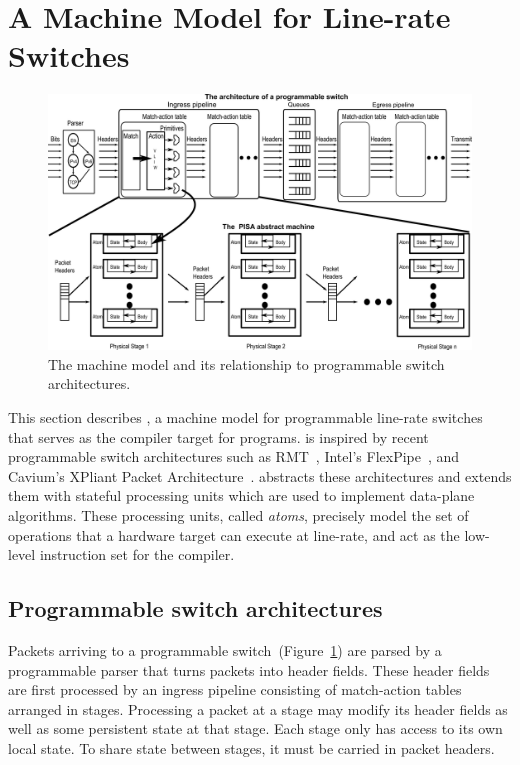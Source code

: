 \section{A Machine Model for Line-rate Switches}
\label{s:absmachine}

\begin{figure}[!t]
  \includegraphics[width=\textwidth]{pisa.pdf}
  \caption{The \absmachine machine model and its relationship to
  programmable switch architectures.}
  \label{fig:switch}
\end{figure}

This section describes \absmachine, a machine model for programmable line-rate
switches that serves as the compiler target for \pktlanguage programs.
\absmachine is inspired by recent programmable switch architectures such as
RMT~\cite{rmt}, Intel's FlexPipe~\cite{flexpipe}, and Cavium's XPliant Packet
Architecture~\cite{xpliant}. \absmachine abstracts these architectures and
extends them with stateful processing units which are used to implement
data-plane algorithms. These processing units, called {\em atoms}, precisely
model the set of operations that a hardware target can execute at line-rate,
and act as the low-level instruction set for the \pktlanguage compiler.

\subsection{Programmable switch architectures}
Packets arriving to a programmable switch~(Figure~\ref{fig:switch})
are parsed by a programmable parser that turns packets into header
fields. These header fields are first processed by an ingress pipeline
consisting of match-action tables arranged in stages. Processing a
packet at a stage may modify its header fields as well as some
persistent state at that stage. Each stage only has access to its
own local state. To share state between stages, it must be carried in
packet headers.

